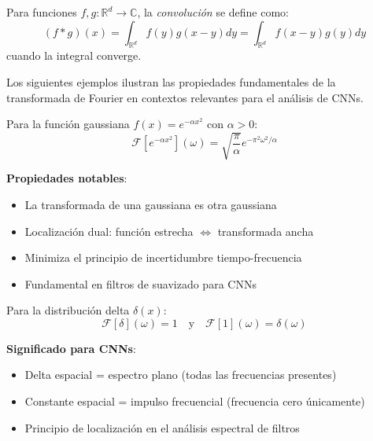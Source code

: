 \begin{definition}\label{def:convolucion_continua}
Para funciones $f, g: \mathbb{R}^d \to \mathbb{C}$, la \textit{convolución} se define como:
\begin{equation}
(f * g)(x) = \int_{\mathbb{R}^d} f(y) g(x - y) dy = \int_{\mathbb{R}^d} f(x - y) g(y) dy
\end{equation}
cuando la integral converge.
\end{definition}

Los siguientes ejemplos ilustran las propiedades fundamentales de la transformada de Fourier en contextos relevantes para el análisis de CNNs.

\begin{example}\label{ex:fourier_gaussian}
Para la función gaussiana $f(x) = e^{-\alpha x^2}$ con $\alpha > 0$:
\begin{equation}
\mathcal{F}[e^{-\alpha x^2}](\omega) = \sqrt{\frac{\pi}{\alpha}} e^{-\pi^2 \omega^2/\alpha}
\end{equation}

\textbf{Propiedades notables}:
\begin{itemize}
    \item La transformada de una gaussiana es otra gaussiana
    \item Localización dual: función estrecha $\Leftrightarrow$ transformada ancha
    \item Minimiza el principio de incertidumbre tiempo-frecuencia
    \item Fundamental en filtros de suavizado para CNNs
\end{itemize}
\end{example}

\begin{example}\label{ex:fourier_delta}
Para la distribución delta $\delta(x)$:
\begin{equation}
\mathcal{F}[\delta](\omega) = 1 \quad \text{y} \quad \mathcal{F}[1](\omega) = \delta(\omega)
\end{equation}

\textbf{Significado para CNNs}:
\begin{itemize}
    \item Delta espacial = espectro plano (todas las frecuencias presentes)
    \item Constante espacial = impulso frecuencial (frecuencia cero únicamente)
    \item Principio de localización en el análisis espectral de filtros
\end{itemize}
\end{example}

